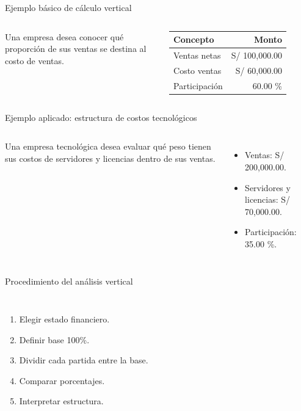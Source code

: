 \begin{frame}{Ejemplo básico de cálculo vertical}
  \begin{columns}[T,onlytextwidth]
    \footnotesize
    Una empresa desea conocer qué proporción de sus ventas se destina al costo de ventas.
    \vspace{0.35em}
    \begin{tabular}{lr}
      \toprule
      Concepto & Monto \\
      \midrule
      Ventas netas & S/ 100,000.00 \\
      Costo ventas & S/ 60,000.00 \\
      Participación & 60.00 \% \\
      \bottomrule
    \end{tabular}
  \end{columns}
\end{frame}

\begin{frame}{Ejemplo aplicado: estructura de costos tecnológicos}
  \begin{columns}[T,onlytextwidth]
    \footnotesize
    Una empresa tecnológica desea evaluar qué peso tienen sus costos de servidores y licencias dentro de sus ventas.
    \vspace{0.25em}
    \begin{itemize}
      \item Ventas: S/ 200,000.00.
      \item Servidores y licencias: S/ 70,000.00.
      \item Participación: 35.00 \%.
    \end{itemize}
  \end{columns}
\end{frame}

\begin{frame}{Procedimiento del análisis vertical}
  \begin{columns}[T,onlytextwidth]
    \begin{enumerate}
      \item Elegir estado financiero.
      \item Definir base 100\%.
      \item Dividir cada partida entre la base.
      \item Comparar porcentajes.
      \item Interpretar estructura.
    \end{enumerate}
  \end{columns}
\end{frame}

